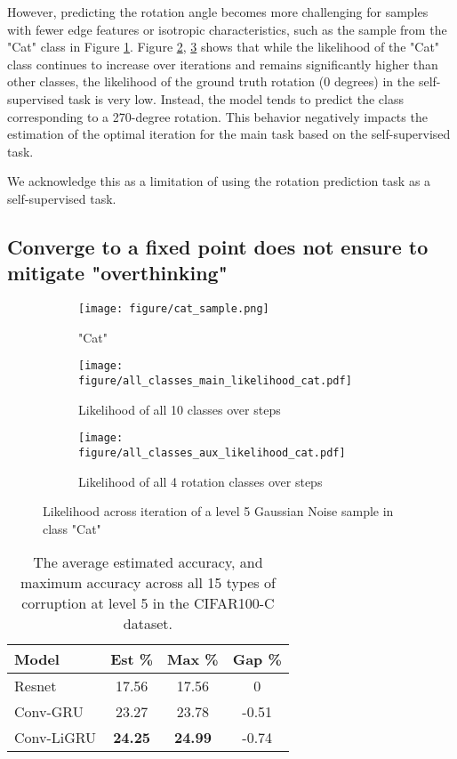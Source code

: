 However, predicting the rotation angle becomes more challenging for samples with fewer edge features or isotropic characteristics, such as the sample from the "Cat" class in Figure \ref{fig:cat_sample}. Figure \ref{fig:all_classes_main_likelihood_hard_cat}, \ref{fig:all_class_likelihood_aux_hard_cat} shows that while the likelihood of the "Cat" class continues to increase over iterations and remains significantly higher than other classes, the likelihood of the ground truth rotation (0 degrees) in the self-supervised task is very low. Instead, the model tends to predict the class corresponding to a 270-degree rotation. This behavior negatively impacts the estimation of the optimal iteration for the main task based on the self-supervised task.

We acknowledge this as a limitation of using the rotation prediction task as a self-supervised task.

\subsection{Converge to a fixed point does not ensure to mitigate "overthinking"}
\begin{figure}[t!]
    \centering
    \begin{subfigure}{0.08\textwidth}
        \texttt{[image: figure/cat\_sample.png]}
        \caption{"Cat"}
        \label{fig:cat_sample}
    \end{subfigure}
    \vfill
    \begin{subfigure}{0.22\textwidth}
        \texttt{[image: figure/all\_classes\_main\_likelihood\_cat.pdf]}
        \caption{Likelihood of all 10 classes over steps}
        \label{fig:all_classes_main_likelihood_hard_cat}
    \end{subfigure}
    \begin{subfigure}{0.22\textwidth}
        \texttt{[image: figure/all\_classes\_aux\_likelihood\_cat.pdf]}
        \caption{Likelihood of all 4 rotation classes over steps}
        \label{fig:all_class_likelihood_aux_hard_cat}
    \end{subfigure}
    \caption{Likelihood across iteration of a level 5 Gaussian Noise sample in class "Cat"}
    \label{fig:likelihood_cat}
\end{figure}

\begin{table}[t!]
\centering
\caption{The average estimated accuracy, and maximum accuracy across all 15 types of corruption at level 5 in the CIFAR100-C dataset.}
\begin{tabular}{l|ccc}
\hline
\textbf{Model} & \textbf{Est \%} & \textbf{Max \%} & \textbf{Gap \%} \\ \hline
Resnet & 17.56 & 17.56 & 0 \\
Conv-GRU & 23.27  & 23.78 & -0.51 \\
Conv-LiGRU & \textbf{24.25} & \textbf{24.99} & -0.74 \\ \hline
\end{tabular}
\label{tab:acc_avg_cifar100}
\end{table}

